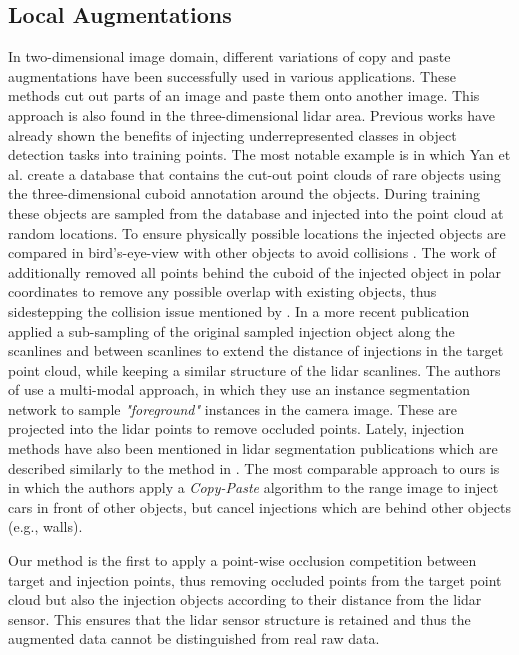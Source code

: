 \documentclass[letterpaper, 10 pt, conference]{ieeeconf}
\begin{document}
\subsection{Local Augmentations}
\label{section:related:local_augmentations}
In two-dimensional image domain, different variations of copy and paste augmentations \cite{yun2019cutmix} have been successfully used in various applications. These methods cut out parts of an image and paste them onto another image. This approach is also found in the three-dimensional lidar area. Previous works have already shown the benefits of injecting underrepresented classes in object detection tasks into training points. The most notable example is \cite{yan2018second} in which Yan et al. create a database that contains the cut-out point clouds of rare objects using the three-dimensional cuboid annotation around the objects. During training these objects are sampled from the database and injected into the point cloud at random locations. To ensure physically possible locations the injected objects are compared in bird's-eye-view with other objects to avoid collisions \cite{yan2018second}. The work of \cite{alsfasser2020exploiting} additionally removed all points behind the cuboid of the injected object in polar coordinates to remove any possible overlap with existing objects, thus sidestepping the collision issue mentioned by \cite{yan2018second}. In a more recent publication \cite{hu2021pattern} applied a sub-sampling of the original sampled injection object along the scanlines and between scanlines to extend the distance of injections in the target point cloud, while keeping a similar structure of the lidar scanlines. The authors of \cite{zhu2021vpfnet} use a multi-modal approach, in which they use an instance segmentation network to sample \textit{"foreground"} instances in the camera image. These are projected into the lidar points to remove occluded points. Lately, injection methods have also been mentioned in lidar segmentation publications \cite{xu2021rpvnet}\cite{zhou2021panoptic} which are described similarly to the method in \cite{yan2018second}. The most comparable approach to ours is \cite{fan2021rangedet} in which the authors apply a \textit{Copy-Paste} algorithm \cite{yun2019cutmix} to the range image to inject cars in front of other objects, but cancel injections which are behind other objects (e.g., walls). 

Our method is the first to apply a point-wise occlusion competition between target and injection points, thus removing occluded points from the target point cloud but also the injection objects according to their distance from the lidar sensor. This ensures that the lidar sensor structure is retained and thus the augmented data cannot be distinguished from real raw data.  
\end{document}
